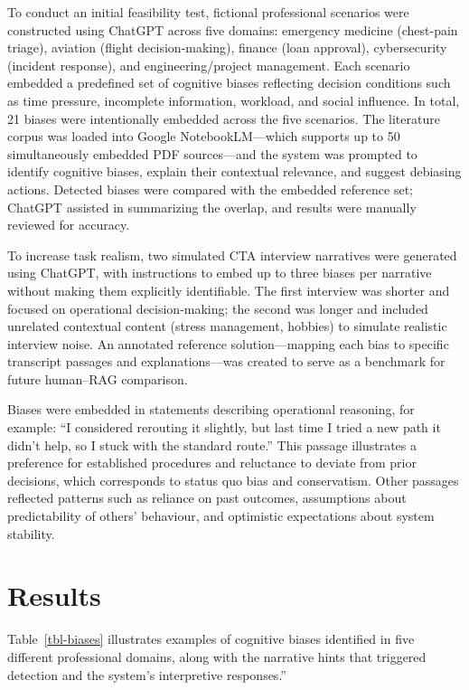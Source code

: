 \documentclass[
  manuscript,
  anonymous,
  review]{acmart}
\begin{document}
To conduct an initial feasibility test, fictional professional scenarios
were constructed using ChatGPT across five domains: emergency medicine
(chest-pain triage), aviation (flight decision-making), finance (loan
approval), cybersecurity (incident response), and engineering/project
management. Each scenario embedded a predefined set of cognitive biases
reflecting decision conditions such as time pressure, incomplete
information, workload, and social influence. In total, 21 biases were
intentionally embedded across the five scenarios. The literature corpus
was loaded into Google NotebookLM---which supports up to 50
simultaneously embedded PDF sources---and the system was prompted to
identify cognitive biases, explain their contextual relevance, and
suggest debiasing actions. Detected biases were compared with the
embedded reference set; ChatGPT assisted in summarizing the overlap, and
results were manually reviewed for accuracy.

To increase task realism, two simulated CTA interview narratives were
generated using ChatGPT, with instructions to embed up to three biases
per narrative without making them explicitly identifiable. The first
interview was shorter and focused on operational decision-making; the
second was longer and included unrelated contextual content (stress
management, hobbies) to simulate realistic interview noise. An annotated
reference solution---mapping each bias to specific transcript passages
and explanations---was created to serve as a benchmark for future
human--RAG comparison.

Biases were embedded in statements describing operational reasoning, for
example: ``I considered rerouting it slightly, but last time I tried a
new path it didn't help, so I stuck with the standard route.'' This
passage illustrates a preference for established procedures and
reluctance to deviate from prior decisions, which corresponds to status
quo bias and conservatism. Other passages reflected patterns such as
reliance on past outcomes, assumptions about predictability of others'
behaviour, and optimistic expectations about system stability.

\section{Results}\label{results}

Table~\ref{tbl-biases} illustrates examples of cognitive biases
identified in five different professional domains, along with the
narrative hints that triggered detection and the system's interpretive
responses.''
\end{document}
